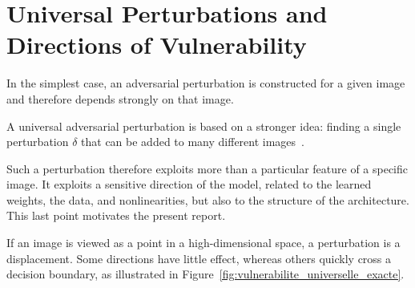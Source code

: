 \section{Universal Perturbations and Directions of Vulnerability}

In the simplest case, an adversarial perturbation is constructed for a given image and therefore depends strongly on that image.

A universal adversarial perturbation is based on a stronger idea: finding a single perturbation $\delta$ that can be added to many
different images~\cite{moosavi2017universal}.

Such a perturbation therefore exploits more than a particular feature of a specific image. It exploits a sensitive direction of the model, related to the learned weights,
the data, and nonlinearities, but also to the structure of the architecture. This last point motivates the present report.

If an image is viewed as a point in a high-dimensional space, a perturbation is a displacement. Some directions have little effect,
whereas others quickly cross a decision boundary, as illustrated in Figure~\ref{fig:vulnerabilite_universelle_exacte}.

